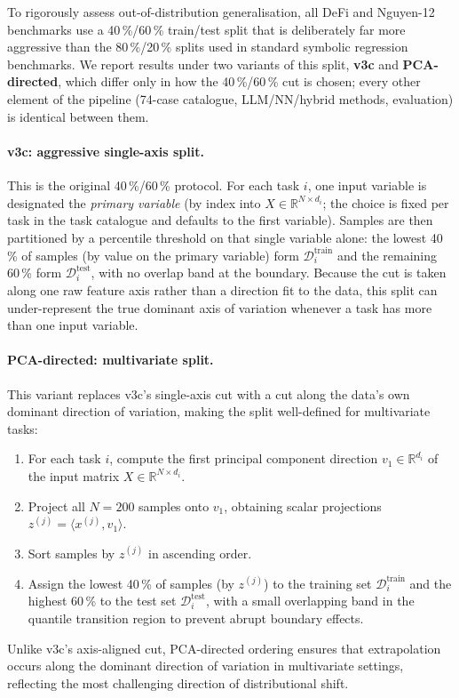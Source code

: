 \documentclass[twoside,11pt]{article}
\begin{document}
To rigorously assess out-of-distribution generalisation, all DeFi and
Nguyen-12 benchmarks use a 40\,\%/60\,\% train/test split that is
deliberately far more aggressive than the 80\,\%/20\,\% splits used in
standard symbolic regression benchmarks. We report results under two
variants of this split, \textbf{v3c} and \textbf{PCA-directed}, which
differ only in how the 40\,\%/60\,\% cut is chosen; every other element of
the pipeline (74-case catalogue, LLM/NN/hybrid methods, evaluation) is
identical between them.

\paragraph{v3c: aggressive single-axis split.}
This is the original 40\,\%/60\,\% protocol. For each task $i$, one input
variable is designated the \emph{primary variable} (by index into
$X \in \mathbb{R}^{N \times d_i}$; the choice is fixed per task in the task
catalogue and defaults to the first variable). Samples are then partitioned
by a percentile threshold on that single variable alone: the lowest 40\,\%
of samples (by value on the primary variable) form
$\mathcal{D}^{\mathrm{train}}_i$ and the remaining 60\,\% form
$\mathcal{D}^{\mathrm{test}}_i$, with no overlap band at the boundary. Because
the cut is taken along one raw feature axis rather than a direction fit to
the data, this split can under-represent the true dominant axis of variation
whenever a task has more than one input variable.

\paragraph{PCA-directed: multivariate split.}
This variant replaces v3c's single-axis cut with a
cut along the data's own dominant direction of variation, making the split
well-defined for multivariate tasks:
\begin{enumerate}[leftmargin=2em,label=\arabic*.]
  \item For each task $i$, compute the first principal component direction
    $v_1 \in \mathbb{R}^{d_i}$ of the input matrix $X \in \mathbb{R}^{N \times d_i}$.
  \item Project all $N=200$ samples onto $v_1$, obtaining scalar projections
    $z^{(j)} = \langle x^{(j)}, v_1 \rangle$.
  \item Sort samples by $z^{(j)}$ in ascending order.
  \item Assign the lowest 40\,\% of samples (by $z^{(j)}$) to the training set
    $\mathcal{D}^{\mathrm{train}}_i$ and the highest 60\,\% to the test set
    $\mathcal{D}^{\mathrm{test}}_i$, with a small overlapping band in the
    quantile transition region to prevent abrupt boundary effects.
\end{enumerate}
Unlike v3c's axis-aligned cut, PCA-directed ordering ensures that
extrapolation occurs along the dominant direction of variation in
multivariate settings, reflecting the most challenging direction of
distributional shift.
\end{document}
